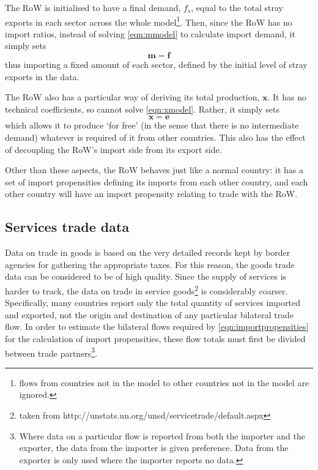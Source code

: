 \documentclass[a4paper]{article}
\begin{document}
The RoW is initialised to have a final demand, $f_s$, equal to the total stray exports in each sector across the whole model\footnote{flows from countries not in the model to other countries not in the model are ignored.}. Then, since the RoW has no import ratios, instead of solving \cref{eqn:mmodel} to calculate import demand, it simply sets
\begin{equation}\label{eqn:RoW_imports}
\boldsymbol{m} = \boldsymbol{f}
\end{equation}
thus importing a fixed amount of each sector, defined by the initial level of stray exports in the data.

The RoW also has a particular way of deriving its total production, $\boldsymbol{x}$. It has no technical coefficients, so cannot solve \cref{eqn:xmodel}. Rather, it simply sets
\begin{equation}\label{eqn:RoW_total_production}
\boldsymbol{x} = \boldsymbol{e}
\end{equation}
which allows it to produce `for free' (in the sense that there is no intermediate demand) whatever is required of it from other countries. This also has the effect of decoupling the RoW's import side from its export side.

Other than these aspects, the RoW behaves just like a normal country: it has a set of import propensities defining its imports from each other country, and each other country will have an import propensity relating to trade with the RoW.

\subsection{Services trade data}
Data on trade in goods is based on the very detailed records kept by border agencies for gathering the appropriate taxes.
For this reason, the goods trade data can be considered to be of high quality.
Since the supply of services is harder to track, the data on trade in service goods\footnote{taken from http://unstats.un.org/unsd/servicetrade/default.aspx} is considerably coarser.
Specifically, many countries report only the total quantity of services imported and exported, not the origin and destination of any particular bilateral trade flow.
In order to estimate the bilateral flows required by \cref{eqn:importpropensities} for the calculation of import propensities, these flow totals must first be divided between trade partners\footnote{Where data on a particular flow is reported from both the importer and the exporter, the data from the importer is given preference.
Data from the exporter is only used where the importer reports no data.}.
\end{document}
